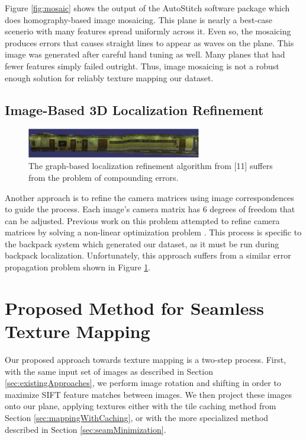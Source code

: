 \message{ !name(paper.tex)}\documentclass[10pt,twocolumn,letterpaper]{article}
\begin{document}
Figure \ref{fig:mosaic} shows the output of the AutoStitch software
package which does homography-based image mosaicing. This plane is
nearly a best-case scenerio with many features spread uniformly across
it. Even so, the mosaicing produces errors that causes straight lines
to appear as waves on the plane. This image was generated after
careful hand tuning as well. Many planes that had fewer features
simply failed outright. Thus, image mosaicing is not a robust enough
solution for reliably texture mapping our dataset.

\subsection{Image-Based 3D Localization Refinement}
\label{sec:imageBased3DRefinement}
\begin{figure}
  \centering
  \includegraphics[width=3in]{Graph_crop.pdf}
  \caption{The graph-based localization refinement algorithm from [11]
    suffers from the problem of compounding errors. }
  \label{fig:graph}
\end{figure}

Another approach is to refine the camera matrices using image
correspondences to guide the process. Each image's camera matrix has 6
degrees of freedom that can be adjusted. Previous work on this problem
attempted to refine camera matrices by solving a non-linear
optimization problem \cite{liu2010indoor}. This process is specific to
the backpack system which generated our dataset, as it must be run
during backpack
localization\cite{liu2010indoor,chen2010indoor}. Unfortunately, this
approach suffers from a similar error propagation problem shown in
Figure \ref{fig:graph}.

\section{Proposed Method for Seamless Texture Mapping}
\label{sec:proposedApproach}
Our proposed approach towards texture mapping is a two-step
process. First, with the same input set of images as described in
Section \ref{sec:existingApproaches}, we perform image rotation and
shifting in order to maximize SIFT feature matches between images. We
then project these images onto our plane, applying textures either
with the tile caching method from Section
\ref{sec:mappingWithCaching}, or with the more specialized method
described in Section \ref{sec:seamMinimization}.
\end{document}
